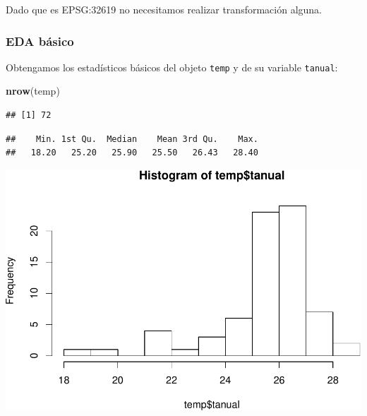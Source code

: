 \documentclass[11pt,]{article}
\newenvironment{Shaded}{\begin{snugshade}}{\end{snugshade}}
\newcommand{\KeywordTok}[1]{\textcolor[rgb]{0.13,0.29,0.53}{\textbf{#1}}}
\newcommand{\OperatorTok}[1]{\textcolor[rgb]{0.81,0.36,0.00}{\textbf{#1}}}
\newcommand{\NormalTok}[1]{#1}
\begin{document}
Dado que es EPSG:32619 no necesitamos realizar transformación alguna.

\subsubsection{EDA básico}\label{eda-buxe1sico-1}

Obtengamos los estadísticos básicos del objeto \texttt{temp} y de su
variable \texttt{tanual}:

\begin{Shaded}
\begin{Highlighting}[]
\KeywordTok{nrow}\NormalTok{(temp)}
\end{Highlighting}
\end{Shaded}

\begin{verbatim}
## [1] 72
\end{verbatim}

\begin{Shaded}
\end{Shaded}

\begin{verbatim}
##    Min. 1st Qu.  Median    Mean 3rd Qu.    Max. 
##   18.20   25.20   25.90   25.50   26.43   28.40
\end{verbatim}

\begin{Shaded}
\end{Shaded}

\includegraphics[width=600px]{proyecto_files/figure-latex/esda-temp-1}
\end{document}
